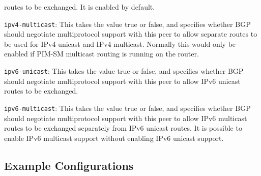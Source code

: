 \begin{description}
\begin{description}
  routes to be exchanged. It is enabled by default.
\item{\tt ipv4-multicast}: This takes the value {\stt true} or {\stt false},
  and specifies whether BGP should
  negotiate multiprotocol support with this peer to allow separate
  routes to be used for IPv4 unicast and IPv4 multicast.  Normally
  this would only be enabled if PIM-SM multicast routing is running on
  the router.
\item{\tt ipv6-unicast}: This takes the value {\stt true} or {\stt false},
  and specifies whether BGP should
  negotiate multiprotocol support with this peer to allow IPv6 unicast
  routes to be exchanged.
\item{\tt ipv6-multicast}: This takes the value {\stt true} or {\stt false},
  and specifies whether BGP should
  negotiate multiprotocol support with this peer to allow IPv6
  multicast routes to be exchanged separately from IPv6 unicast
  routes.  It is possible to enable IPv6 multicast support without
  enabling IPv6 unicast support.
\end{description}

\subsection{Example Configurations}
\vspace{0.1in}
\noindent{}
\vspace{0.1in}


\end{description}
